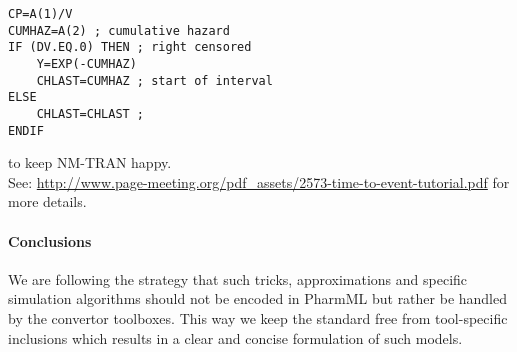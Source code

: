 \myStartLine

\lstset{language=NONMEMdataSet}
\begin{lstlisting}
CP=A(1)/V 
CUMHAZ=A(2) ; cumulative hazard 
IF (DV.EQ.0) THEN ; right censored 
    Y=EXP(-CUMHAZ) 
    CHLAST=CUMHAZ ; start of interval 
ELSE 
    CHLAST=CHLAST ; 
ENDIF   
\end{lstlisting}

\myEndLine

to keep NM-TRAN happy. \\
See: \url{http://www.page-meeting.org/pdf_assets/2573-time-to-event-tutorial.pdf}  for more details.

%
%
%
\paragraph{Conclusions}
We are following the strategy that such tricks, \marginpar{\HandCuffLeft} approximations and specific 
simulation algorithms should not be encoded in PharmML but rather be handled by the convertor 
toolboxes. This way we keep the standard free from tool-specific inclusions which results in a clear and 
concise formulation of such models.







